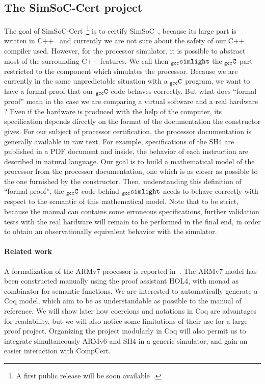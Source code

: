 \documentclass[a4paper, 11pt]{article}
\newcommand{\ccert}{CompCert\xspace}
\newcommand{\newrelease}{A first public release will be soon available}
\newcommand{\gccSL}{$_{\tt gcc}{\tt simlight}$\xspace}
\newcommand{\gccC}{$_{\tt gcc}{\tt C}$\xspace}
\newcommand{\simsoc}{SimSoC\xspace}
\newcommand{\SScert}{SimSoC-Cert\xspace}
\begin{document}
\subsection{The \SScert project}
The goal of \SScert~\footnote{\newrelease~\cite{urlsscert}.} is to certify \simsoc~\cite{arm}, because its large part is written in C++~\cite{ossc09} and currently we are not sure about the safety of our C++ compiler used. However, for the processor simulator, it is possible to abstract most of the surrounding C++ features. We call then \gccSL the \gccC part restricted to the component which simulates the processor. Because we are currently in the same unpredictable situation with a \gccC program, we want to have a formal proof that our \gccC code behaves correctly. But what does ``formal proof'' mean in the case we are comparing a virtual software and a real hardware ? Even if the hardware is produced with the help of the computer, its specification depends directly on the format of the documentation the constructor gives. For our subject of processor certification, the processor documentation is generally available in raw text. For example, specifications of the SH4 are published in a PDF document and inside, the behavior of each instruction are described in natural language. Our goal is to build a mathematical model of the processor from the processor documentation, one which is as closer as possible to the one furnished by the constructor. Then, understanding this definition of ``formal proof'', the \gccC code behind \gccSL needs to behave correctly with respect to the semantic of this mathematical model. Note that to be strict, because the manual can contains some erroneous specifications, further validation tests with the real hardware will remain to be performed in the final end, in order to obtain an observationally equivalent behavior with the simulator.

\paragraph{Related work}
A formalization of the ARMv7 processor is reported in~\cite{conf/itp/FoxM10}. The ARMv7 model has been constructed manually using the proof assistant HOL4, with monad as combinator for semantic functions. 
We are interested to automatically generate a Coq model, which aim to be as understandable as possible to the manual of reference. We will show later how coercions and notations in Coq are advantages for readability, but we will also notice some limitations of their use for a large proof project. Organizing the project modularly in Coq will also permit us to integrate simultaneously ARMv6 and SH4 in a generic simulator, and gain an easier interaction with \ccert.
\end{document}

